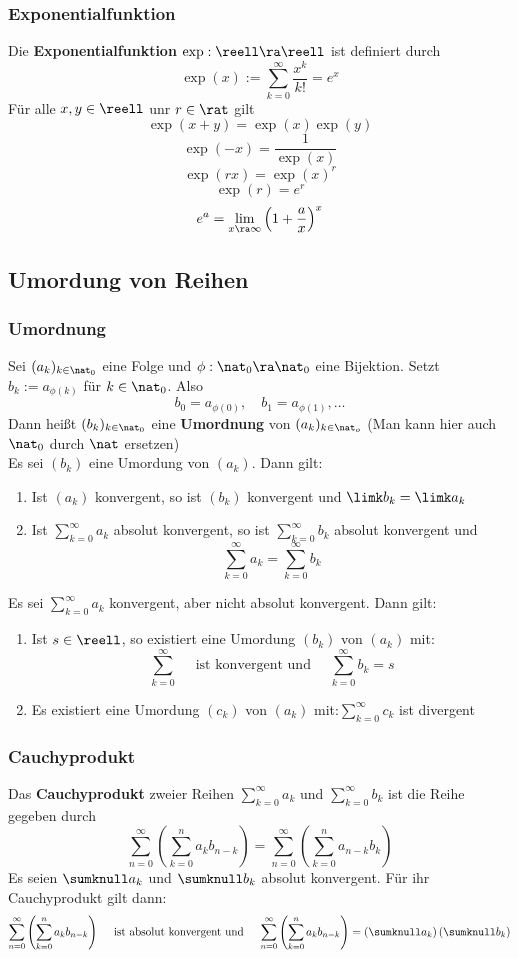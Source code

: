 \documentclass{kit}
\begin{document}
    \subsubsection{Exponentialfunktion}
      Die \textbf{Exponentialfunktion} $\exp:\reell\ra\reell$ ist definiert durch
      $$\exp(x):=\sum^\infty_{k=0}\frac{x^k}{k!}=e^x$$
      Für alle $x,y\in\reell$ unr $r\in\rat$ gilt
      $$\exp(x+y)=\exp(x)\exp(y)$$
      $$\exp(-x)=\frac{1}{\exp(x)}$$
      $$\exp(rx)=\exp(x)^r$$
      $$\exp(r)=e^r$$
      $$e^a=\lim_{x\ra\infty}\left(1+\frac{a}{x}\right)^x$$
  \subsection{Umordung von Reihen}
    \subsubsection{Umordnung}
      Sei $(a_k)_{k\in\nat_0}$ eine Folge und $\phi:\nat_0\ra\nat_0$ eine Bijektion. Setzt $b_k:=a_{\phi(k)}$ für $k\in\nat_0$. Also
      $$b_0=a_{\phi(0)},\quad b_1=a_{\phi(1)},\dots$$
      Dann heißt $(b_k)_{k\in\nat_0}$ eine \textbf{Umordnung} von $(a_k)_{k\in\nat_o}$ (Man kann hier auch $\nat_0$ durch $\nat$ ersetzen)\\
      Es sei $(b_k)$ eine Umordung von $(a_k)$. Dann gilt:
      \begin{enumerate}
        \item Ist $(a_k)$ konvergent, so ist $(b_k)$ konvergent und $\limk b_k=\limk a_k$
        \item Ist $\sum^\infty_{k=0}a_k$ absolut konvergent, so ist $\sum^\infty_{k=0}b_k$ absolut konvergent und
          $$\sum^\infty_{k=0}a_k=\sum^\infty_{k=0}b_k$$
      \end{enumerate}
      Es sei $\sum^\infty_{k=0}a_k$ konvergent, aber nicht absolut konvergent. Dann gilt:
      \begin{enumerate}
        \item Ist $s\in\reell$, so existiert eine Umordung $(b_k)$ von $(a_k)$ mit:
          $$\sum^\infty_{k=0}\quad\text{ ist konvergent und }\quad\sum^\infty_{k=0}b_k=s$$
        \item Es existiert eine Umordung $(c_k)$ von $(a_k)$ mit:$\sum^\infty_{k=0}c_k$ ist divergent
      \end{enumerate}
    \subsubsection{Cauchyprodukt}
      Das \textbf{Cauchyprodukt} zweier Reihen $\sum^\infty_{k=0}a_k$ und $\sum^\infty_{k=0}b_k$ ist die Reihe gegeben durch
      $$\sum^\infty_{n=0}\left(\sum^n_{k=0}a_kb_{n-k}\right)=\sum^\infty_{n=0}\left(\sum^n_{k=0}a_{n-k}b_k\right)$$
      Es seien $\sumknull a_k$ und $\sumknull b_k$ absolut konvergent. Für ihr Cauchyprodukt gilt dann:
      $$\sum^\infty_{n=0}\left(\sum^n_{k=0}a_kb_{n-k}\right)\quad\text{ ist absolut konvergent und }\quad \sum^\infty_{n=0}\left(\sum^n_{k=0}a_kb_{n-k}\right)=\left(\sumknull a_k\right)\left(\sumknull b_k\right)$$
\end{document}
